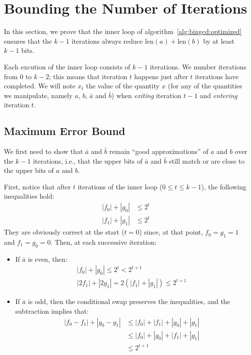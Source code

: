 \documentclass{llncs}
\newcommand{\bitlength}{\text{len}}
\begin{document}
\appendix

\newpage
\section{Bounding the Number of Iterations}\label{sec:iterbound}

In this section, we prove that the inner loop of
algorithm~\ref{alg:bingcd:optimized} ensures that the $k-1$ iterations
always reduce $\bitlength(a)+\bitlength(b)$ by at least $k-1$ bits.

Each excution of the inner loop consists of $k-1$ iterations. We number
iterations from $0$ to $k-2$; this means that iteration $t$ happens just
after $t$ iterations have completed. We will note $x_t$ the value of the
quantity $x$ (for any of the quantities we manipulate, namely $a$, $b$,
$\bar a$ and $\bar b$) when \emph{exiting} iteration $t-1$ and
\emph{entering} iteration $t$.

\subsection{Maximum Error Bound}\label{sec:iterbound:error}

We first need to show that $\bar a$ and $\bar b$ remain ``good
approximations'' of $a$ and $b$ over the $k-1$ iterations, i.e.,
that the upper bits of $\bar a$ and $\bar b$ still match or are
close to the upper bits of $a$ and $b$.

First, notice that after $t$ iterations of the inner loop
($0\leq t\leq k-1$), the following inequalities hold:
\begin{align*}
    |f_0| + |g_0| &\leq 2^t \\
    |f_1| + |g_1| &\leq 2^t
\end{align*}
They are obviously correct at the start ($t = 0$) since, at that point,
$f_0 = g_1 = 1$ and $f_1 = g_0 = 0$. Then, at each successive iteration:
\begin{itemize}

    \item If $\bar a$ is even, then:
    \begin{equation*}
        \begin{gathered}
            |f_0| + |g_0| \leq 2^t < 2^{t+1} \\
            |2f_1| + |2g_1| = 2(|f_1| + |g_1|) \leq 2^{t+1}
        \end{gathered}
    \end{equation*}

    \item If $\bar a$ is odd, then the conditional swap preserves the
    inequalities, and the subtraction implies that:
    \begin{align*}
        |f_0 - f_1| + |g_0 - g_1| &\leq |f_0| + |f_1| + |g_0| + |g_1| \\
                                  &\leq |f_0| + |g_0| + |f_1| + |g_1| \\
                                  &\leq 2^{t+1}
    \end{align*}

\end{itemize}
\end{document}
